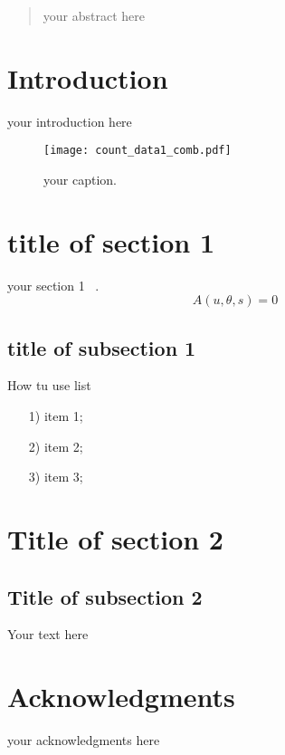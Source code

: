 \documentclass{nato-sto}
\def\scn{s}
\begin{document}
\maketitle

\begin{abstract}
your abstract here

\end{abstract}

\tableofcontents

\section{Introduction}

your introduction here
\begin{figure}[t]
\begin{center}
\texttt{[image: count\_data1\_comb.pdf]} 
\end{center}
\caption{your caption.}
\label{fig:label}
\end{figure}



\section{title of section 1}

your section 1 ~\cite{Wu2009}. 
\begin{equation}\label{eq:abstprob}
 A(u,\theta,\scn) = 0
\end{equation}

\subsection{title of subsection 1}

How tu use list
\begin{enumerate}
\item[1)]
item 1;
\item[2)]
item 2;
\item[3)]
item 3;
\end{enumerate}

\section{Title of section 2}

\subsection{Title of subsection 2}

Your text here


\section*{Acknowledgments}
your acknowledgments here


\end{document}
